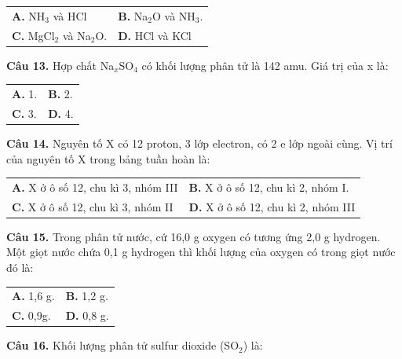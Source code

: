 \documentclass{article}
\begin{document}
\begin{tabularx}{\linewidth}{@{}X X@{}}
\textbf{A.} NH$_{3}$ và HCl & \textbf{B.} Na$_{2}$O và NH$_{3}$.\\[8pt]
\textbf{C.} MgCl$_{2}$ và Na$_{2}$O. & \textbf{D.} HCl và KCl
\end{tabularx}

\newpage

\fontsize{26}{34}\selectfont

\textbf{Câu 13.} Hợp chất Na$_{x}$SO$_{4}$ có khối lượng phân tử là 142 amu. Giá trị của x là:
\vspace{6pt}

\begin{tabularx}{\linewidth}{@{}X X@{}}
\textbf{A.} 1. & \textbf{B.} 2.\\[8pt]
\textbf{C.} 3. & \textbf{D.} 4.
\end{tabularx}

\vspace*{\fill}

\textbf{Câu 14.} Nguyên tố X có 12 proton, 3 lớp electron, có 2 e lớp ngoài cùng. Vị trí của nguyên tố X trong bảng tuần hoàn là:
\vspace{6pt}

\begin{tabularx}{\linewidth}{@{}X X@{}}
\textbf{A.} X ở ô số 12, chu kì 3, nhóm III & \textbf{B.} X ở ô số 12, chu kì 2, nhóm I.\\[8pt]
\textbf{C.} X ở ô số 12, chu kì 3, nhóm II & \textbf{D.} X ở ô số 12, chu kì 2, nhóm III
\end{tabularx}

\newpage

\fontsize{26}{34}\selectfont

\textbf{Câu 15.} Trong phân tử nước, cứ 16,0 g oxygen có tương ứng 2,0 g hydrogen. Một giọt nước chứa 0,1 g hydrogen thì khối lượng của oxygen có trong giọt nước đó là:
\vspace{6pt}

\begin{tabularx}{\linewidth}{@{}X X@{}}
\textbf{A.} 1,6 g. & \textbf{B.} 1,2 g.\\[8pt]
\textbf{C.} 0,9g. & \textbf{D.} 0,8 g.
\end{tabularx}

\vspace*{\fill}

\textbf{Câu 16.} Khối lượng phân tử sulfur dioxide (SO$_{2}$) là:
\vspace{6pt}
\end{document}
